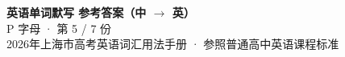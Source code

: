 \documentclass[10pt,a4paper]{article}
\begin{document}
\pagestyle{plain}

\begin{center}
{\LARGE\bfseries 英语单词默写 \quad 参考答案（中 $\to$ 英）}\\[0.22em]
{\large P 字母 · 第 5 / 7 份}\\[0.18em]
{\small 2026年上海市高考英语词汇用法手册 · 参照普通高中英语课程标准}
\end{center}

\vspace{0.2em}
\noindent{\color{rulegray}\rule{\textwidth}{0.8pt}}

\vspace{0.35em}

\vspace{0.25em}
\renewcommand{\arraystretch}{1.32}
\end{document}
